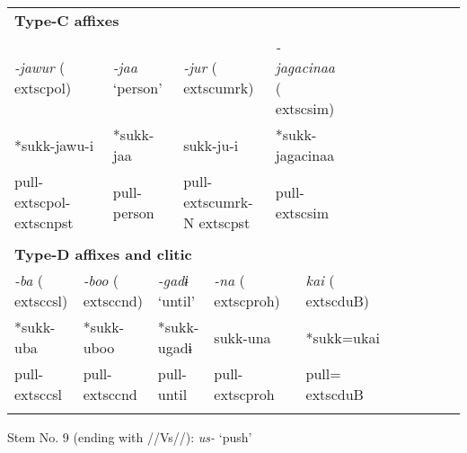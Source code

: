 \begin{tabularx}{\textwidth}{XXXXXXXXXXXXXXXXXXXXXXXX}
\multicolumn{24}{X}{{\bfseries Type-C affixes}}\\
\multicolumn{4}{X}{{ \textit{{}-jawur} (	extsc{pol})}} & \multicolumn{3}{X}{{ \textit{{}-jaa} ‘person’}} & \multicolumn{5}{X}{{ \textit{{}-jur} (	extsc{umrk})}} & \multicolumn{4}{X}{{ \textit{{}-jagacinaa} (	extsc{sim})}} & \multicolumn{8}{X}{}\\
\multicolumn{4}{X}{{ *sukk-jawu-i}} & \multicolumn{3}{X}{*sukk-jaa} & \multicolumn{5}{X}{sukk-ju-i} & \multicolumn{4}{X}{{ *sukk-jagacinaa}} & \multicolumn{8}{X}{}\\
\multicolumn{4}{X}{pull-	extsc{pol}-	extsc{npst}} & \multicolumn{3}{X}{pull-person} & \multicolumn{5}{X}{pull-	extsc{umrk}-N	extsc{pst}} & \multicolumn{4}{X}{pull-	extsc{sim}} & \multicolumn{8}{X}{}\\
\multicolumn{24}{X}{}\\
\multicolumn{24}{X}{{\bfseries Type-D affixes and clitic}}\\
\multicolumn{2}{X}{{ \textit{{}-ba} (	extsc{csl})}} & \multicolumn{4}{X}{{ \textit{{}-boo} (	extsc{cnd})}} & \multicolumn{3}{X}{{ \textit{{}-gadɨ} ‘until’}} & \multicolumn{4}{X}{{ \textit{{}-na} (	extsc{proh})}} & \multicolumn{6}{X}{{ \textit{kai} (	extsc{du}B)}} & \multicolumn{5}{X}{}\\
\multicolumn{2}{X}{{ *sukk-uba}} & \multicolumn{4}{X}{{ *sukk-uboo}} & \multicolumn{3}{X}{{ *sukk-ugadɨ}} & \multicolumn{4}{X}{{ sukk-una}} & \multicolumn{6}{X}{{ *sukk=ukai}} & \multicolumn{5}{X}{}\\
\multicolumn{2}{X}{pull-	extsc{csl}} & \multicolumn{4}{X}{pull-	extsc{cnd}} & \multicolumn{3}{X}{pull-until} & \multicolumn{4}{X}{pull-	extsc{proh}} & \multicolumn{6}{X}{pull=	extsc{du}B} & \multicolumn{5}{X}{}\\
\lspbottomrule
\end{tabularx}
Stem No. 9 (ending with //Vs//): \textit{us-} ‘push’

\tablefirsthead{}

